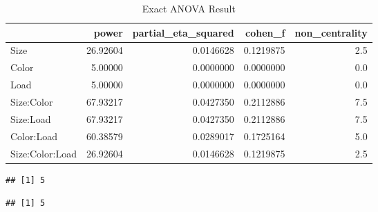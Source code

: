\documentclass[
]{book}
\newenvironment{Shaded}{\begin{snugshade}}{\end{snugshade}}
\newcommand{\CommentTok}[1]{\textcolor[rgb]{0.56,0.35,0.01}{\textit{#1}}}
\newcommand{\FunctionTok}[1]{\textcolor[rgb]{0.00,0.00,0.00}{#1}}
\newcommand{\NormalTok}[1]{#1}
\newcommand{\OtherTok}[1]{\textcolor[rgb]{0.56,0.35,0.01}{#1}}
\newcommand{\SpecialCharTok}[1]{\textcolor[rgb]{0.00,0.00,0.00}{#1}}
\begin{document}
\begin{table}[!h]

\caption{\label{tab:unnamed-chunk-196}Exact ANOVA Result}
\centering
\begin{tabular}[t]{l|r|r|r|r}
\hline
  & power & partial\_eta\_squared & cohen\_f & non\_centrality\\
\hline
Size & 26.92604 & 0.0146628 & 0.1219875 & 2.5\\
\hline
Color & 5.00000 & 0.0000000 & 0.0000000 & 0.0\\
\hline
Load & 5.00000 & 0.0000000 & 0.0000000 & 0.0\\
\hline
Size:Color & 67.93217 & 0.0427350 & 0.2112886 & 7.5\\
\hline
Size:Load & 67.93217 & 0.0427350 & 0.2112886 & 7.5\\
\hline
Color:Load & 60.38579 & 0.0289017 & 0.1725164 & 5.0\\
\hline
Size:Color:Load & 26.92604 & 0.0146628 & 0.1219875 & 2.5\\
\hline
\end{tabular}
\end{table}

\begin{Shaded}
\end{Shaded}

\begin{verbatim}
## [1] 5
\end{verbatim}

\begin{Shaded}
\end{Shaded}

\begin{verbatim}
## [1] 5
\end{verbatim}

\begin{Shaded}
\end{Shaded}
\end{document}
